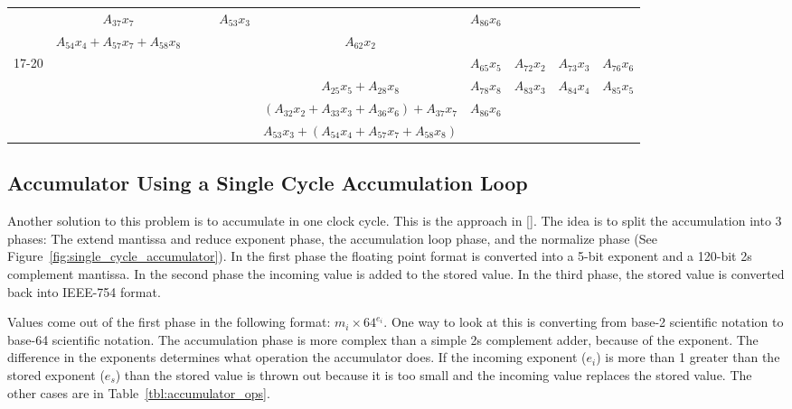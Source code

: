 \begin{sidewaystable}
\begin{tabular}{|c||c|c|c|c||c||c|c|c|c|}
        \cline{2-10}
        & $A_{37}x_7$ & & & $A_{53}x_3$ & & $A_{86}x_6$ & & & \\
        \cline{2-10}
        & $A_{54}x_4 + A_{57}x_7 + A_{58}x_8$ & & & & $A_{62}x_2$ & & & & \\
        \hline
        \hline
        \multirow{4}{*}{17-20} & & & & & & $A_{65}x_5$ & $A_{72}x_2$ & $A_{73}x_3$ & $A_{76}x_6$ \\
        \cline{2-10}
        & & & & & $A_{25}x_5 + A_{28}x_8$ & $A_{78}x_8$ & $A_{83}x_3$ & $A_{84}x_4$ & $A_{85}x_5$\\
        \cline{2-10}
        & & & & & $\left(A_{32}x_2 + A_{33}x_3 + A_{36}x_6\right) + A_{37}x_7$ & $A_{86}x_6$ & & & \\
        \cline{2-10}
        & & & & & $A_{53}x_3 + \left(A_{54}x_4 + A_{57}x_7 + A_{58}x_8\right)$ & & & & \\
        \hline


    \end{tabular}
\end{sidewaystable}

\subsection{Accumulator Using a Single Cycle Accumulation Loop}
Another solution to this problem is to accumulate in one clock cycle. This is the approach in [\cite{prelim:bachir}]. The idea is to split the accumulation into 3 phases: The extend mantissa and reduce exponent phase, the accumulation loop phase, and the normalize phase (See Figure~\ref{fig:single_cycle_accumulator}). In the first phase the floating point format is converted into a 5-bit exponent and a 120-bit 2s complement mantissa. In the second phase the incoming value is added to the stored value. In the third phase, the stored value is converted back into IEEE-754 format.

Values come out of the first phase in the following format: $m_i\times 64^{e_i}$. One way to look at this is converting from base-2 scientific notation to base-64 scientific notation. The accumulation phase is more complex than a simple 2s complement adder, because of the exponent. The difference in the exponents determines what operation the accumulator does. If the incoming exponent ($e_i$) is more than 1 greater than the stored exponent ($e_s$) than the stored value is thrown out because it is too small and the incoming value replaces the stored value. The other cases are in Table~\ref{tbl:accumulator_ops}.

